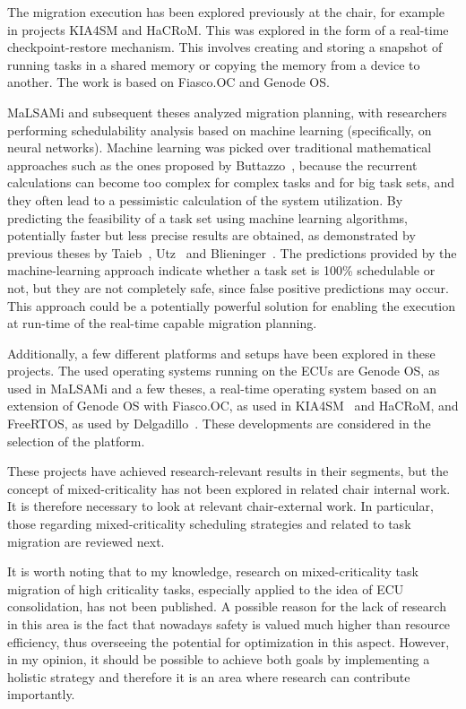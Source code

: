 The migration execution has been explored previously at the chair, for example in projects KIA4SM and HaCRoM. This was explored in the form of a real-time checkpoint-restore mechanism. This involves creating and storing a snapshot of running tasks in a shared memory or copying the memory from a device to another. The work is based on Fiasco.OC and Genode OS. 

MaLSAMi and subsequent theses analyzed migration planning, with researchers performing schedulability analysis based on machine learning (specifically, on neural networks). Machine learning was picked over traditional mathematical approaches such as the ones proposed by Buttazzo~\parencite{buttazzo1}, because the recurrent calculations can become too complex for complex tasks and for big task sets, and they often lead to a pessimistic calculation of the system utilization. By predicting the feasibility of a task set using machine learning algorithms, potentially faster but less precise results are obtained, as demonstrated by previous theses by Taieb~\parencite{taieb1}, Utz~\parencite{utz1} and Blieninger~\parencite{blieninger1}. The predictions provided by the machine-learning approach indicate whether a task set is 100\% schedulable or not, but they are not completely safe, since false positive predictions may occur. This approach could be a potentially powerful solution for enabling the execution at run-time of the real-time capable migration planning. 

Additionally, a few different platforms and setups have been explored in these projects. The used operating systems running on the ECUs are Genode OS, as used in MaLSAMi and a few theses, a real-time operating system based on an extension of Genode OS with Fiasco.OC, as used in KIA4SM~\parencite{kia1} and HaCRoM, and FreeRTOS, as used by Delgadillo~\parencite{delgadillo1}. These developments are considered in the selection of the platform.

These projects have achieved research-relevant results in their segments, but the concept of mixed-criticality has not been explored in related chair internal work. It is therefore necessary to look at relevant chair-external work. In particular, those regarding mixed-criticality scheduling strategies and related to task migration are reviewed next.

It is worth noting that to my knowledge, research on mixed-criticality task migration of high criticality tasks, especially applied to the idea of ECU consolidation, has not been published. A possible reason for the lack of research in this area is the fact that nowadays safety is valued much higher than resource efficiency, thus overseeing the potential for optimization in this aspect. However, in my opinion, it should be possible to achieve both goals by implementing a holistic strategy and therefore it is an area where research can contribute importantly.


